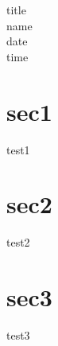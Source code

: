 \documentclass[10pt,a4j,report]{article}
\begin{document}
title\\
name\\
date\\
time

\section{sec1}
  test1
\section{sec2}
  test2
\section{sec3}
  test3

  
\end{document}
